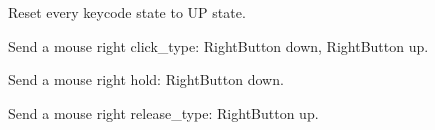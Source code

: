 \documentclass[letterpaper,10pt,english]{sphinxmanual}
\begin{document}

\begin{fulllineitems}
\label{macro:macro.release_all_keys}
Reset every keycode state to UP state.

\end{fulllineitems}


\begin{fulllineitems}
\label{macro:macro.right_click}
Send a mouse right click\_type: RightButton down, RightButton up.

\end{fulllineitems}


\begin{fulllineitems}
\label{macro:macro.right_hold}
Send a mouse right hold: RightButton down.

\end{fulllineitems}


\begin{fulllineitems}
\label{macro:macro.right_release}
Send a mouse right release\_type: RightButton up.

\end{fulllineitems}

\end{document}
